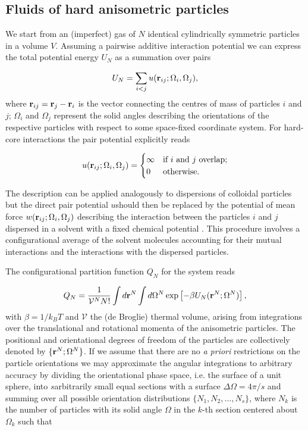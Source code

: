 \subsection{Fluids of hard anisometric particles}

We start from an (imperfect) gas of $N$ identical cylindrically symmetric particles in a volume $V$. Assuming a pairwise additive interaction potential we can express the total potential energy $U_{N}$  as a summation over pairs

\begin{equation}
U_{N}=\sum_{i<j} u({\bf r}_{ij}; \Omega_{i}, \Omega_{j}),
\end{equation}
where ${\bf r}_{ij}={\bf r} _{j}- {\bf r} _{i}$ is the vector connecting the centres of mass of particles $i$ and $j$; $\Omega_{i}$ and $\Omega_{j}$ represent the solid angles describing the orientations of the respective particles with respect to some space-fixed coordinate system. For hard-core interactions the pair potential explicitly reads

\begin{equation}
u({\bf r}_{ij}; \Omega_{i}, \Omega_{j}) =
\begin{cases}
\infty  &\text{if $i$ and $j$ overlap;} \\
0 &\text{otherwise.} \label{0pairpot}
\end{cases}
\end{equation}

The  description can be applied analogously to dispersions of colloidal particles but the direct pair potential $u$should then be replaced by the potential of mean force $w({\bf r}_{ij};\Omega_{i},\Omega_{j})$ describing the interaction between the  particles $i$ and $j$dispersed in a  solvent with a fixed chemical potential \cite{macmillan,Hill}. This procedure involves a configurational average of the solvent molecules accounting for their mutual interactions and the interactions with the dispersed particles.

The configurational partition function $Q_{N}$ for the system reads

\begin{equation}
Q_{N}=\frac{1}{\mathcal{V} ^{N} N!}\int d{\bf r}^{N}\int d\Omega ^{N}\exp\left[-\beta U_{N}({\bf r}^{N}; \Omega^{N})\right],
\label{0qdef}
\end{equation}
with $\beta= 1/k_{B}T$ and $\mathcal{V}$ the (de Broglie) thermal volume, arising from integrations over the translational and rotational momenta of the anisometric particles. The positional and orientational degrees of freedom of the particles are collectively denoted by $\{{\bf r}^{N};\Omega^{N}\}$. If we assume that there are no  {\em a priori} restrictions on the particle orientations we may approximate the  angular integrations  to arbitrary accuracy by dividing the orientational phase space, i.e. the surface of a unit sphere, into $s$arbitrarily small equal sections  with a surface $\Delta \Omega = 4\pi/s$ and summing over all possible orientation distributions $\{N_{1},N_{2}, \ldots, N_{s}\}$, where $N_{k}$ is the number of particles with its solid angle $\Omega$ in the $k$-th section centered about
$\Omega_{k}$ such that


